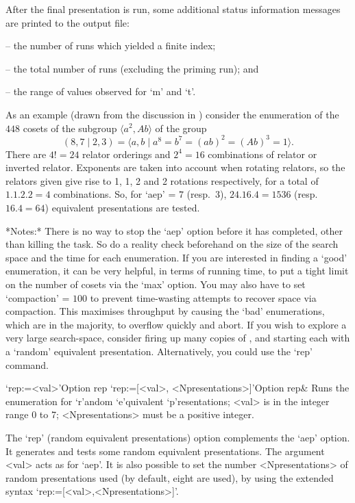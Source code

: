 After  the  final  presentation  is  run,   some   additional   status
information messages are printed to the {\ACE} output file:

\beginlist
\item{--}  the number of runs which yielded a finite index; 
\item{--}  the total number of runs (excluding the priming run); and 
\item{--}  the range of values observed for `m' and `t'.
\endlist

As an example (drawn from the discussion in \cite{HR99a}) consider the
enumeration of the  $448$  cosets  of  the  subgroup  $\langle  a^2,Ab
\rangle$ of the group
$$ (8,7 \mid 2,3) 
    = \langle a,b \mid a^8 = b^7 = (ab)^2 = (Ab)^3 = 1 \rangle. $$
There are $4!=24$  relator  orderings  and  $2^4=16$  combinations  of
relator or inverted relator. Exponents are  taken  into  account  when
rotating relators, so the relators given give rise to 1, 1,  2  and  2
rotations respectively, for a total of $1.1.2.2=4$  combinations.  So,
for  `aep'  =  $7$   (resp.~$3$),   $24.16.4=1536$   (resp.~$16.4=64$)
equivalent presentations are tested.

*Notes:*
There is no way to stop the `aep'  option  before  it  has  completed,
other than killing the task. So do a reality check beforehand  on  the
size of the search space and the time for each enumeration. If you are
interested in  finding  a  \lq{}good'  enumeration,  it  can  be  very
helpful, in terms of running time, to put a tight limit on the  number
of cosets via the `max' option. You may also have to set  `compaction'
=  $100$  to  prevent  time-wasting  attempts  to  recover  space  via
compaction.  This  maximises  throughput  by  causing  the   \lq{}bad'
enumerations, which are in  the  majority,  to  overflow  quickly  and
abort. If you wish to explore  a  very  large  search-space,  consider
firing up many copies of {\ACE}, and starting each with a \lq{}random'
equivalent  presentation.  Alternatively,  you  could  use  the  `rep'
command.

\beginitems

\>`rep:=<val>'{Option rep}
\>`rep:=[<val>, <Npresentations>]'{Option rep}&
Runs  the enumeration for `r'andom `e'quivalent `p'resentations;
<val> is in the integer range 0 to 7;
<Npresentations> must be a positive integer.

\enditems

The `rep' (random equivalent  presentations)  option  complements  the
`aep'  option.  It  generates  and  tests   some   random   equivalent
presentations. The argument <val>  acts  as  for  `aep'.  It  is  also
possible to set the number <Npresentations>  of  random  presentations
used (by default, eight  are  used),  by  using  the  extended  syntax
`rep:=[<val>,<Npresentations>]'.

